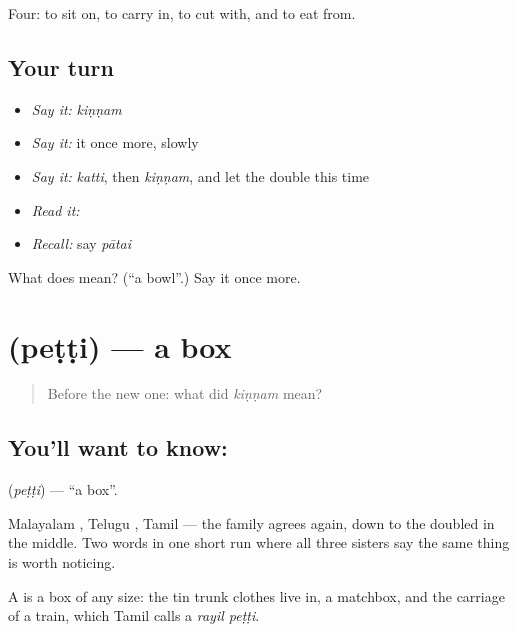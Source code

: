 \begin{grammarlens}[title={What you've built}]
Four: to sit on, to carry in, to cut with, and to eat from.
\end{grammarlens}

\subsection*{Your turn}
\begin{itemize}
\raggedright
  \item \emph{Say it:} \emph{kiṇṇam}
  \item \emph{Say it:} it once more, slowly
  \item \emph{Say it:} \emph{katti}, then \emph{kiṇṇam}, and let the  double this time
  \item \emph{Read it:} \textbf{}
  \item \emph{Recall:} say \emph{pātai}
\end{itemize}

\begin{tcolorbox}[breakable,colback=teal!4,colframe=teal!35!black,title={Before you move on}]
What does  mean? (\textquotedblleft{}a bowl\textquotedblright{}.) Say it once more.
\end{tcolorbox}
\section[\texorpdfstring{\ta{பெட்டி} (peṭṭi)}{பெட்டி (peṭṭi)}]{ (peṭṭi) — a box}

\label{lesson:TA-C54-box}



\begin{quote}
Before the new one: what did \emph{kiṇṇam} mean?
\end{quote}

\subsection*{You'll want to know: }
\textbf{} (\emph{peṭṭi}) — \textquotedblleft{}a box\textquotedblright{}.

Malayalam , Telugu , Tamil  — the family agrees again, down to the doubled  in the middle. Two words in one short run where all three sisters say the same thing is worth noticing.

A  is a box of any size: the tin trunk clothes live in, a matchbox, and the carriage of a train, which Tamil calls a \emph{rayil peṭṭi}.

